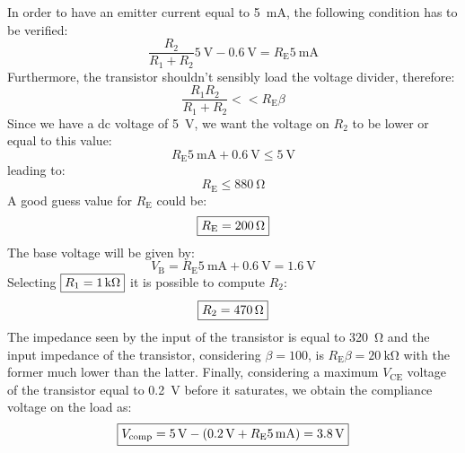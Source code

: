 In order to have an emitter current equal to \SI{5}{\milli\ampere}, the following condition has to be verified:
\[\frac{R_2}{R_1+R_2}\SI{5}{\volt}-\SI{0.6}{\volt}=R_\text{E}\SI{5}{\milli\ampere}\]
Furthermore, the transistor shouldn't sensibly load the voltage divider, therefore:
\[\frac{R_1R_2}{R_1+R_2}<<R_\text{E}\beta\]
Since we have a dc voltage of \SI{5}{\volt}, we want the voltage on $R_2$ to be lower or equal to this value:
\[R_\text{E}\SI{5}{\milli\ampere}+\SI{0.6}{\volt}\leq\SI{5}{\volt}\]
leading to:
\[R_\text{E}\leq\SI{880}{\ohm}\]
A good guess value for $R_\text{E}$ could be:
\[\boxed{R_\text{E}=\SI{200}{\ohm}}\]
The base voltage will be given by:
\[V_\text{B}=R_\text{E}\SI{5}{\milli\ampere}+\SI{0.6}{\volt}=\SI{1.6}{\volt}\]
Selecting $\boxed{R_1=\SI{1}{\kilo\ohm}}$ it is possible to compute  $R_2$:
\[\boxed{R_2=\SI{470}{\ohm}}\]
The impedance seen by the input of the transistor is equal to \SI{320}{\ohm} and the input impedance of the transistor, considering $\beta=100$, is $R_\text{E}\beta=  \SI{20}{\kilo\ohm}$ with the former much lower than the latter.
Finally, considering a maximum $V_\text{CE}$ voltage of the transistor equal to \SI{0.2}{\volt} before it saturates, we obtain the compliance voltage on the load as:
\[\boxed{V_\text{comp}=\SI{5}{\volt}-(\SI{0.2}{\volt}+R_\text{E}\SI{5}{\milli\ampere})=\SI{3.8}{\volt}}\]



















